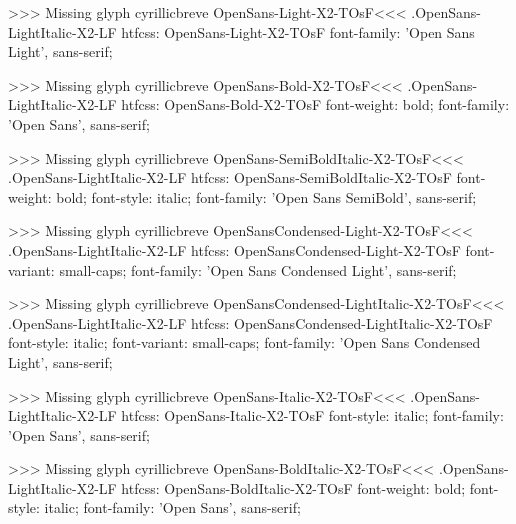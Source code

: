 >>>
Missing glyph	cyrillicbreve
\<OpenSans-Light-X2-TOsF\><<<
.OpenSans-LightItalic-X2-LF
htfcss:  OpenSans-Light-X2-TOsF  font-family: 'Open Sans Light', sans-serif;

>>>
Missing glyph	cyrillicbreve
\<OpenSans-Bold-X2-TOsF\><<<
.OpenSans-LightItalic-X2-LF
htfcss:  OpenSans-Bold-X2-TOsF  font-weight: bold; font-family: 'Open Sans', sans-serif;

>>>
Missing glyph	cyrillicbreve
\<OpenSans-SemiBoldItalic-X2-TOsF\><<<
.OpenSans-LightItalic-X2-LF
htfcss:  OpenSans-SemiBoldItalic-X2-TOsF  font-weight: bold; font-style: italic; font-family: 'Open Sans SemiBold', sans-serif;

>>>
Missing glyph	cyrillicbreve
\<OpenSansCondensed-Light-X2-TOsF\><<<
.OpenSans-LightItalic-X2-LF
htfcss:  OpenSansCondensed-Light-X2-TOsF  font-variant: small-caps; font-family: 'Open Sans Condensed Light', sans-serif;

>>>
Missing glyph	cyrillicbreve
\<OpenSansCondensed-LightItalic-X2-TOsF\><<<
.OpenSans-LightItalic-X2-LF
htfcss:  OpenSansCondensed-LightItalic-X2-TOsF  font-style: italic; font-variant: small-caps; font-family: 'Open Sans Condensed Light', sans-serif;

>>>
Missing glyph	cyrillicbreve
\<OpenSans-Italic-X2-TOsF\><<<
.OpenSans-LightItalic-X2-LF
htfcss:  OpenSans-Italic-X2-TOsF  font-style: italic; font-family: 'Open Sans', sans-serif;

>>>
Missing glyph	cyrillicbreve
\<OpenSans-BoldItalic-X2-TOsF\><<<
.OpenSans-LightItalic-X2-LF
htfcss:  OpenSans-BoldItalic-X2-TOsF  font-weight: bold; font-style: italic; font-family: 'Open Sans', sans-serif;

